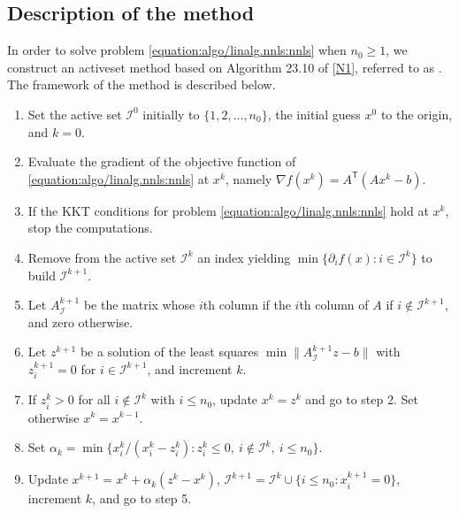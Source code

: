 \documentclass[letterpaper,10pt,english]{sphinxmanual}
\newcommand{\norm}[2][]{#1\lVert#2#1\rVert}
\newcommand{\set}[2][]{#1\{#2#1\}}
\def\T{\ensuremath{\mathsf{T}}}
\begin{document}
\subsection{Description of the method}
\label{\detokenize{algo/linalg.nnls:description-of-the-method}}
\sphinxAtStartPar
In order to solve problem \eqref{equation:algo/linalg.nnls:nnls} when \(n_0 \ge 1\), we construct an
active\sphinxhyphen{}set method based on Algorithm 23.10 of {[}\hyperlink{cite.algo/linalg.nnls:cite-1-nnls-lawson-hanson-1974}{N1}{]},
referred to as . The framework of the method is described below.
\begin{enumerate}
%
\item {} 
\sphinxAtStartPar
Set the active set \(\mathcal{I}^0\) initially to
\(\set{1, 2, \dots, n_0}\), the initial guess \(x^0\) to the
origin, and \(k = 0\).

\item {} 
\sphinxAtStartPar
Evaluate the gradient of the objective function of \eqref{equation:algo/linalg.nnls:nnls} at
\(x^k\), namely \(\nabla f(x^k) = A^{\T} (Ax^k - b)\).

\item {} 
\sphinxAtStartPar
If the KKT conditions for problem \eqref{equation:algo/linalg.nnls:nnls} hold at \(x^k\), stop the
computations.

\item {} 
\sphinxAtStartPar
Remove from the active set \(\mathcal{I}^k\) an index yielding
\(\min \set{\partial_i f(x) : i \in \mathcal{I}^k}\) to build
\(\mathcal{I}^{k + 1}\).

\item {} 
\sphinxAtStartPar
Let \(A_{\scriptscriptstyle\mathcal{I}}^{k + 1}\) be the matrix whose
\(i\)\sphinxhyphen{}th column if the \(i\)\sphinxhyphen{}th column of \(A\) if
\(i \notin \mathcal{I}^{k + 1}\), and zero otherwise.

\item {} 
\sphinxAtStartPar
Let \(z^{k + 1}\) be a solution of the least squares
\(\min \norm{A_{\scriptscriptstyle\mathcal{I}}^{k + 1} z - b}\) with
\(z_i^{k + 1} = 0\) for \(i \in \mathcal{I}^{k + 1}\), and increment
\(k\).

\item {} 
\sphinxAtStartPar
If \(z_i^k > 0\) for all \(i \notin \mathcal{I}^k\) with
\(i \le n_0\), update \(x^k = z^k\) and go to step 2. Set otherwise
\(x^k = x^{k - 1}\).

\item {} 
\sphinxAtStartPar
Set \(\alpha_k = \min \set{x_i^k / (x_i^k - z_i^k) : z_i^k \le 0, ~ i \notin \mathcal{I}^k, ~ i \le n_0}\).

\item {} 
\sphinxAtStartPar
Update \(x^{k + 1} = x^k + \alpha_k (z^k - x^k)\),
\(\mathcal{I}^{k + 1} = \mathcal{I}^k \cup \set{i \le n_0 : x_i^{k + 1} = 0}\),
increment \(k\), and go to step 5.

\end{enumerate}
\end{document}
